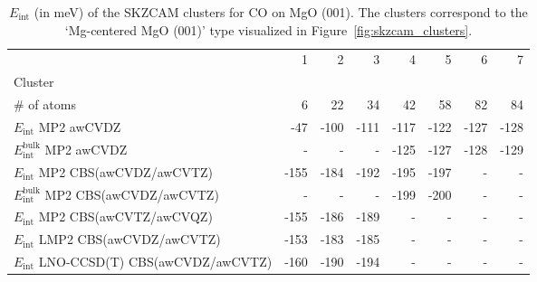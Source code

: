 \begin{table}
\caption{\label{tab:system_eint_mgo_co}$E_\textrm{int}$ (in meV) of the SKZCAM clusters for CO on MgO (001). The clusters correspond to the `Mg-centered MgO (001)' type visualized in Figure~\ref{fig:skzcam_clusters}.}
\begin{adjustbox}{center,max width=1.4\textwidth}
\begin{tabular}{lrrrrrrr}
\toprule
 & 1 & 2 & 3 & 4 & 5 & 6 & 7 \\ 
Cluster &  &  &  &  &  &  &  \\
\midrule
\# of atoms & 6 & 22 & 34 & 42 & 58 & 82 & 84 \\
$E_\textrm{int}$ MP2 awCVDZ & -47 & -100 & -111 & -117 & -122 & -127 & -128 \\
$E_\textrm{int}^\textrm{bulk}$ MP2 awCVDZ & - & - & - & -125 & -127 & -128 & -129 \\
$E_\textrm{int}$ MP2 CBS(awCVDZ/awCVTZ) & -155 & -184 & -192 & -195 & -197 & - & - \\
$E_\textrm{int}^\textrm{bulk}$ MP2 CBS(awCVDZ/awCVTZ) & - & - & - & -199 & -200 & - & - \\
$E_\textrm{int}$ MP2 CBS(awCVTZ/awCVQZ) & -155 & -186 & -189 & - & - & - & - \\
$E_\textrm{int}$ LMP2 CBS(awCVDZ/awCVTZ) & -153 & -183 & -185 & - & - & - & - \\
$E_\textrm{int}$ LNO-CCSD(T) CBS(awCVDZ/awCVTZ) & -160 & -190 & -194 & - & - & - & - \\
\bottomrule
\end{tabular}
\end{adjustbox}
\end{table}

